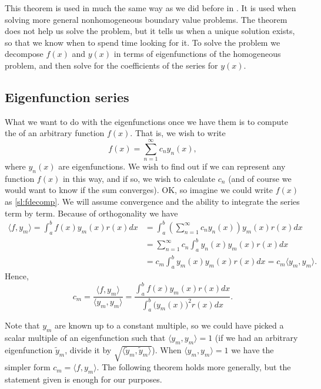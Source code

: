 \documentclass{ximera}
\begin{document}
This theorem is used in much the same way as we did before in .  It is used when solving more general nonhomogeneous boundary value problems.  The theorem does not help us solve the problem, but it tells us when a unique solution exists, so that we know when to spend time looking for it.  To solve the problem we decompose $f(x)$ and $y(x)$ in terms of eigenfunctions of the homogeneous problem, and then solve for the coefficients of the series for $y(x)$.

\subsection{Eigenfunction series}

What we want to do with the eigenfunctions once we have them is to compute the \emph{} of an arbitrary function $f(x)$.  That is, we wish to write
\begin{equation} \label{sl:fdecomp}
    f(x) = \sum_{n=1}^\infty c_n y_n(x) ,
\end{equation}
where $y_n(x)$ are eigenfunctions. We wish to find out if we can represent any function $f(x)$ in this way, and if so, we wish to calculate $c_n$ (and of course we would want to know if the sum converges).  OK\@, so imagine we could write $f(x)$ as \eqref{sl:fdecomp}.  We will assume convergence and the ability to integrate the series term by term. Because of orthogonality we have
\begin{equation*}
    \begin{split}
        \langle f , y_m \rangle  = \int_a^b f(x)  y_m (x)  r(x)  dx
        & = \int_a^b \left( \sum_{n=1}^\infty c_n y_n(x) \right)  y_m (x)  r(x) dx\\
        &= \sum_{n=1}^\infty c_n \int_a^b y_n(x)  y_m (x)  r(x)  dx\\
        &= c_m \int_a^b y_m(x)  y_m (x)  r(x)  dx = c_m \langle y_m , y_m \rangle .
    \end{split}
\end{equation*}
Hence,
\begin{equation} \label{sl:cm}
    c_m = \frac{\langle f , y_m \rangle}{\langle y_m , y_m \rangle}
        = \frac{\int_a^b f(x)  y_m (x) r(x)  dx}%
        {\int_a^b {\bigl(y_m(x)\bigr)}^2  r(x) dx} .
\end{equation}

Note that $y_m$ are known up to a constant multiple, so we could have picked a scalar multiple of an eigenfunction such that $\langle y_m , y_m \rangle = 1$ (if we had an arbitrary eigenfunction $\tilde{y}_m$, divide it by $\sqrt{\langle \tilde{y}_m , \tilde{y}_m \rangle}$). When $\langle y_m , y_m \rangle = 1$ we have the simpler form $c_m = \langle f, y_m \rangle$.
The following theorem holds more generally, but the statement given is enough for our purposes.
\end{document}
